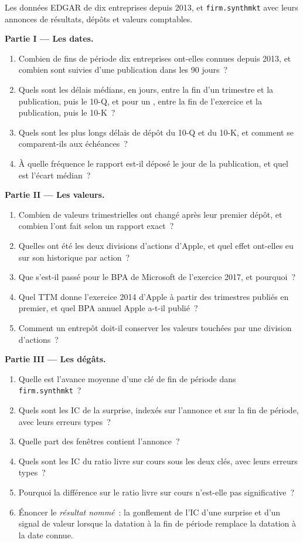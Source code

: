 \begin{problem}\label{pb:rs:fundamental-analyst-and-event-features:1}
Les données EDGAR de dix entreprises depuis 2013, et \texttt{firm.synthmkt} avec leurs annonces de résultats, dépôts et valeurs comptables.

\medskip\noindent\textbf{Partie I --- Les dates.}
\begin{enumerate}
\item Combien de fins de période dix entreprises ont-elles connues depuis 2013, et combien sont suivies d'une publication dans les 90 jours~?
\item Quels sont les délais médians, en jours, entre la fin d'un trimestre et la publication, puis le 10-Q, et pour un , entre la fin de l'exercice et la publication, puis le 10-K~?
\item Quels sont les plus longs délais de dépôt du 10-Q et du 10-K, et comment se comparent-ils aux échéances~?
\item À quelle fréquence le rapport est-il déposé le jour de la publication, et quel est l'écart médian~?
\end{enumerate}

\medskip\noindent\textbf{Partie II --- Les valeurs.}
\begin{enumerate}[resume]
\item Combien de valeurs trimestrielles ont changé après leur premier dépôt, et combien l'ont fait selon un rapport exact~?
\item Quelles ont été les deux divisions d'actions d'Apple, et quel effet ont-elles eu sur son historique par action~?
\item Que s'est-il passé pour le BPA de Microsoft de l'exercice 2017, et pourquoi~?
\item Quel TTM donne l'exercice 2014 d'Apple à partir des trimestres publiés en premier, et quel BPA annuel Apple a-t-il publié~?
\item Comment un entrepôt doit-il conserver les valeurs touchées par une division d'actions~?
\end{enumerate}

\medskip\noindent\textbf{Partie III --- Les dégâts.}
\begin{enumerate}[resume]
\item Quelle est l'avance moyenne d'une clé de fin de période dans \texttt{firm.synthmkt}~?
\item Quels sont les IC de la surprise, indexés sur l'annonce et sur la fin de période, avec leurs erreurs types~?
\item Quelle part des fenêtres contient l'annonce~?
\item Quels sont les IC du ratio livre sur cours sous les deux clés, avec leurs erreurs types~?
\item Pourquoi la différence sur le ratio livre sur cours n'est-elle pas significative~?
\item Énoncer le \emph{résultat nommé}~: la gonflement de l'IC d'une surprise et d'un signal de valeur lorsque la datation à la fin de période remplace la datation à la date connue.
\end{enumerate}


\end{problem}

